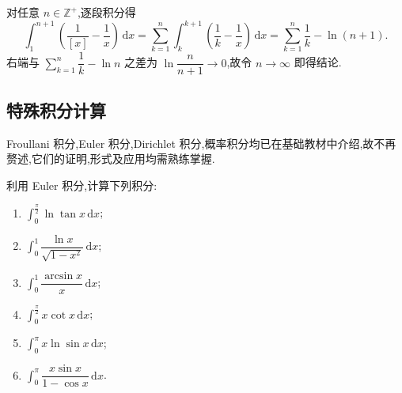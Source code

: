 \begin{solution}
  对任意 $n\in\mathbb{Z}^+$,逐段积分得
  \[
    \displaystyle\int_1^{n+1}\left(\dfrac{1}{[x]}-\dfrac{1}{x}\right)\,\mathrm{d}x
    =\sum\limits_{k=1}^{n}\int_k^{k+1}\left(\dfrac{1}{k}-\dfrac{1}{x}\right)\,\mathrm{d}x
    =\sum\limits_{k=1}^{n}\dfrac{1}{k}-\ln(n+1).
  \]
  右端与 $\displaystyle\sum\limits_{k=1}^{n}\dfrac{1}{k}-\ln n$ 之差为
  $\ln\dfrac{n}{n+1}\to0$,故令 $n\to\infty$ 即得结论.
\end{solution}



\subsection{特殊积分计算}

Froullani 积分,Euler 积分,Dirichlet 积分,概率积分均已在基础教材中介绍,故不再赘述,它们的证明,形式及应用均需熟练掌握.

\begin{example}
  利用 Euler 积分,计算下列积分:
  \begin{enumerate}
    \item $\displaystyle\int_0^{\frac{\pi}{2}}\ln\tan x\,\mathrm{d}x$;
    \item $\displaystyle\int_0^1\dfrac{\ln x}{\sqrt{1-x^2}}\,\mathrm{d}x$;
    \item $\displaystyle\int_0^1\dfrac{\arcsin x}{x}\,\mathrm{d}x$;
    \item $\displaystyle\int_0^{\frac{\pi}{2}}x\cot x\,\mathrm{d}x$;
    \item $\displaystyle\int_0^\pi x\ln\sin x\,\mathrm{d}x$;
    \item $\displaystyle\int_0^\pi\dfrac{x\sin x}{1-\cos x}\,\mathrm{d}x$.
  \end{enumerate}
\end{example}
\exampleblank

